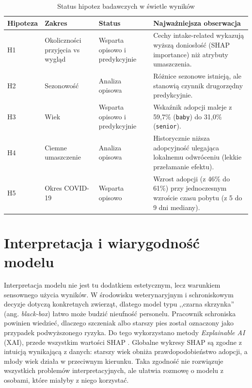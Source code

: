 \begin{table}[htbp]
\centering
\caption{Status hipotez badawczych w świetle wyników}
\label{tab:status-hipotez-badawczych}
\small
\begin{tabular}{|p{}|p{}|p{}|p{}|}
\hline
\rowcolor{LightGray}
\textbf{Hipoteza} & \textbf{Zakres} & \textbf{Status} & \textbf{Najważniejsza obserwacja} \\
\hline
H1 & Okoliczności przyjęcia vs wygląd & Wsparta opisowo i predykcyjnie & Cechy intake-related wykazują wyższą doniosłość (SHAP importance) niż atrybuty umaszczenia. \\
\hline
H2 & Sezonowość & Analiza opisowa & Różnice sezonowe istnieją, ale stanowią czynnik drugorzędny predykcyjnie. \\
\hline
H3 & Wiek & Wsparta opisowo i predykcyjnie & Wskaźnik adopcji maleje z 59,7\% (\texttt{baby}) do 31,0\% (\texttt{senior}). \\
\hline
H4 & Ciemne umaszczenie & Analiza opisowa & Historycznie niższa adopcyjność ulegająca lokalnemu odwróceniu (lekkie przełamanie efektu). \\
\hline
H5 & Okres COVID-19 & Wsparta opisowo & Wzrost adopcji (z 46\% do 61\%) przy jednoczesnym wzroście czasu pobytu (z 5 do 9 dni mediany). \\
\hline
\end{tabular}
\end{table}

\section{Interpretacja i wiarygodność modelu}
\label{sec:interpretacja-wiarygodnosc-modelu}

Interpretacja modelu nie jest tu dodatkiem estetycznym, lecz warunkiem sensownego użycia wyników. W środowisku weterynaryjnym i schroniskowym decyzje dotyczą konkretnych zwierząt, dlatego model typu ,,czarna skrzynka'' (ang. \emph{black-box}) łatwo może budzić nieufność personelu. Pracownik schroniska powinien wiedzieć, dlaczego szczeniak albo starszy pies został oznaczony jako przypadek podwyższonego ryzyka. Do tego wykorzystano metody \emph{Explainable AI} (XAI), przede wszystkim wartości SHAP \cite{Lundberg2017}. Globalne wykresy SHAP są zgodne z intuicją wynikającą z danych: starszy wiek obniża prawdopodobieństwo adopcji, a młody wiek działa w przeciwnym kierunku. Taka zgodność nie rozwiązuje wszystkich problemów interpretacyjnych, ale ułatwia rozmowę o modelu z osobami, które miałyby z niego korzystać.

